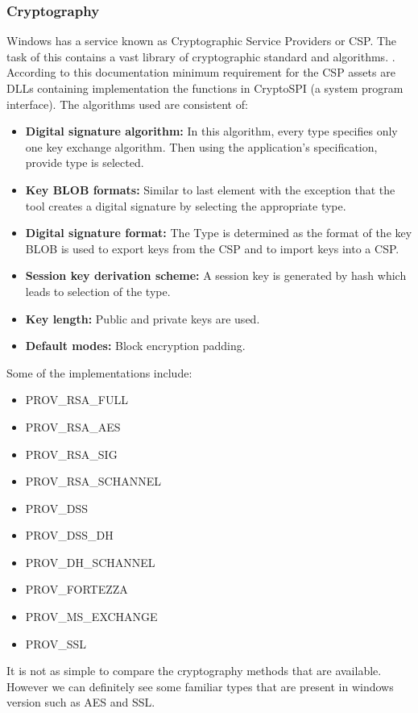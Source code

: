 \documentclass[journal,10pt,onecolumn,compsoc,letterpaper,draftclsnofoot,table,xcdraw]{IEEEtran} \usepackage[margin=0.75in]{geometry}
\begin{document}
\subsubsection{Cryptography}
\noindent Windows has a service known as Cryptographic Service Providers or CSP. The task of this contains a vast library of cryptographic standard and algorithms. \cite{10}. According to this documentation minimum requirement for the CSP assets are DLLs containing implementation the functions in CryptoSPI (a system program interface). The algorithms used are consistent of:
\begin{itemize}
\item \textbf{Digital signature algorithm:} In this algorithm, every type specifies only one key exchange algorithm. Then using the application's specification, provide type is selected.
\item \textbf{Key BLOB formats:} Similar to last element with the exception that  the tool creates a digital signature by selecting the appropriate type.
\item \textbf{Digital signature format:} The Type is determined as the format of the key BLOB is used to export keys from the CSP and to import keys into a CSP.
\item \textbf{Session key derivation scheme:} A session key is generated by hash which leads to selection of the type.
\item \textbf{Key length:} Public and private keys are used.
\item \textbf{Default modes:} Block  encryption padding.
\end{itemize}
\noindent Some of the implementations include:
\begin{itemize}
\item PROV\_RSA\_FULL
\item PROV\_RSA\_AES
\item PROV\_RSA\_SIG
\item PROV\_RSA\_SCHANNEL
\item PROV\_DSS
\item PROV\_DSS\_DH
\item PROV\_DH\_SCHANNEL
\item PROV\_FORTEZZA
\item PROV\_MS\_EXCHANGE
\item PROV\_SSL
\end{itemize}
\noindent It is not as simple to compare the cryptography methods that are available. However we can definitely see some familiar types that are present in windows version such as AES and SSL.
\end{document}
